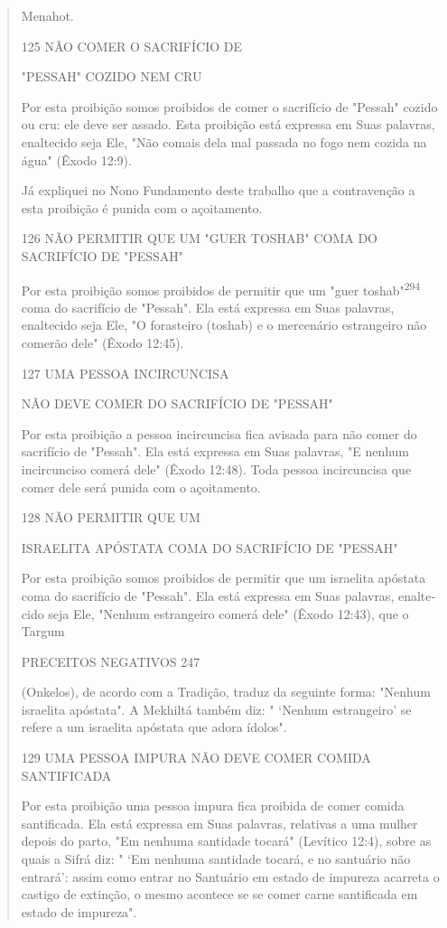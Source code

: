 \begin{quote}
Menahot.

125 NÃO COMER O SACRIFÍCIO DE

"PESSAH" COZIDO NEM CRU

Por esta proibição somos proibidos de comer o sacrifício de "Pes­sah"
cozido ou cru: ele deve ser assado. Esta proibição está expressa em Suas
palavras, enaltecido seja Ele, "Não comais dela mal passada no fogo nem
cozi­da na água" (Êxodo 12:9).

Já expliquei no Nono Fundamento deste trabalho que a contraven­ção a
esta proibição é punida com o açoitamento.

126 NÃO PERMITIR QUE UM "GUER TOSHAB" COMA DO SACRIFÍCIO DE "PESSAH"

Por esta proibição somos proibidos de permitir que um "guer
tos­hab"\textsuperscript{294} coma do sacrifício de "Pessah". Ela está
expressa em Suas palavras, enaltecido seja Ele, "O forasteiro (toshab) e
o mercenário estrangeiro não co­merão dele" (Êxodo 12:45).

127 UMA PESSOA INCIRCUNCISA

NÃO DEVE COMER DO SACRIFÍCIO DE "PESSAH"

Por esta proibição a pessoa incircuncisa fica avisada para não comer do
sacrifício de "Pessah". Ela está expressa em Suas palavras, "E nenhum
incir­cunciso comerá dele" (Êxodo 12:48). Toda pessoa incircuncisa que
comer de­le será punida com o açoitamento.

128 NÃO PERMITIR QUE UM

ISRAELITA APÓSTATA COMA DO SACRIFÍCIO DE "PESSAH"

Por esta proibição somos proibidos de permitir que um israelita
após­tata coma do sacrifício de "Pessah". Ela está expressa em Suas
palavras, enalte­cido seja Ele, "Nenhum estrangeiro comerá dele" (Êxodo
12:43), que o Targum

PRECEITOS NEGATIVOS 247

(Onkelos), de acordo com a Tradição, traduz da seguinte forma: "Nenhum
is­raelita apóstata". A Mekhiltá também diz: " `Nenhum estrangeiro' se
refere a um israelita apóstata que adora ídolos".

129 UMA PESSOA IMPURA NÃO DEVE COMER COMIDA SANTIFICADA

Por esta proibição uma pessoa impura fica proibida de comer co­mida
santificada. Ela está expressa em Suas palavras, relativas a uma mulher
depois do parto, "Em nenhuma santidade tocará" (Levítico 12:4), sobre as
quais a Sifrá diz: " `Em nenhuma santidade tocará, e no santuário não
entrará': assim como entrar no Santuário em estado de impureza acarreta
o castigo de extinção, o mesmo acontece se se comer carne santificada em
estado de impureza".


\end{quote}
